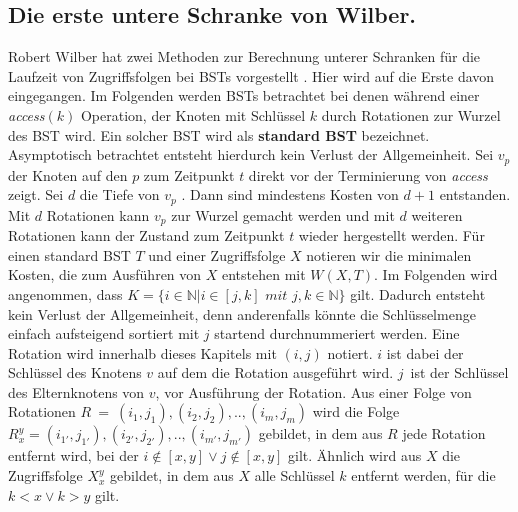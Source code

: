 \documentclass[a4paper,12pt]{article}
\begin{document}
\subsection{Die erste untere Schranke von Wilber.} \label{wilberBound}
Robert Wilber hat zwei Methoden zur Berechnung unterer Schranken für die Laufzeit von Zugriffsfolgen bei BSTs vorgestellt \cite{wilberLowerBounds}. Hier wird auf die Erste davon eingegangen. Im Folgenden werden BSTs betrachtet bei denen während einer \textit{access$(k)$} Operation, der Knoten mit Schlüssel $k$ durch Rotationen zur Wurzel des BST wird. Ein solcher BST wird als \textbf{standard BST} bezeichnet. Asymptotisch betrachtet entsteht hierdurch kein Verlust der Allgemeinheit. Sei $v_p$ der Knoten auf den $p$ zum Zeitpunkt $t$ direkt vor der Terminierung von \textit{access} zeigt. Sei $d$ die Tiefe von $v_p$ . Dann sind mindestens Kosten von $d + 1$ entstanden. Mit $d$ Rotationen kann $v_p$ zur Wurzel gemacht werden und mit $d$ weiteren Rotationen kann der Zustand zum Zeitpunkt $t$ wieder hergestellt werden.
Für einen standard BST $T$ und einer Zugriffsfolge $X$ notieren wir die minimalen Kosten, die zum Ausführen von $X$ entstehen mit $W(X, T)$. Im Folgenden wird angenommen, dass 
$K = \{  i \in \mathbb{N} \vert i \in \left[j,k\right] \textit{ mit } j,k \in  \mathbb{N} \} $ gilt. Dadurch entsteht kein Verlust der Allgemeinheit, denn anderenfalls könnte die Schlüsselmenge einfach aufsteigend sortiert mit $j$ startend durchnummeriert werden. Eine Rotation wird innerhalb dieses Kapitels mit $\left(i, j\right)$ notiert. $i$ ist dabei der Schlüssel des Knotens $v$ auf dem die Rotation ausgeführt wird. $j$~ist der Schlüssel des Elternknotens von $v$, vor Ausführung der Rotation. Aus einer Folge von Rotationen $R~=~\left(i_1,j_1 \right),\left(i_2,j_2 \right),..,\left(i_m,j_m \right)$ wird die Folge  $R^y_x = \left(i_{1'},j_{1'}\right),\left(i_{2'},j_{2'} \right),..,\left(i_{m'},j_{m'} \right)$ gebildet, in dem aus $R$ jede Rotation entfernt wird, bei der $i\notin \left[x,y\right] \lor j\notin \left[x,y\right]$ gilt. Ähnlich wird aus $X$ die Zugriffsfolge $X^y_x$ gebildet, in dem aus $X$ alle Schlüssel $k$ entfernt werden, für die $k < x  \lor k > y$ gilt.
\end{document}
